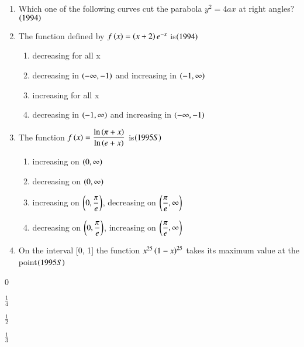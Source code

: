 \documentclass[journal,12pt,twocolumn]{IEEEtran}
\theoremstyle{remark}
\begin{document}
\begin{enumerate}
\begin{enumerate}[label=\alph*.]
\end{enumerate}
\item Which one of the following curves cut the \indent  parabola
$y^2 = 4ax$ at right angles?\hfill$\left(1994\right)$
\begin{enumerate}[label=\alph*.]
\end{enumerate}
\item The function defined by $f\left(x\right) = \left(x+2\right)e^{-x}$ 	
is\hfill$\left(1994\right)$
\begin{enumerate}[label=\alph*.]
	\item decreasing for all x
	\item decreasing in $\left(-\infty, -1\right)$ and increasing
		in $\left(-1, \infty\right)$
        \item increasing for all x
	\item decreasing in $\left(-1, \infty\right)$ and increasing
		in $\left(-\infty, -1\right)$\\
\end{enumerate}
\item The function $f\left(x\right) = 
	\displaystyle\frac{\ln \left(\pi + x\right)}{\ln \left(e + x\right)}$ 
is\hfill$\left(1995S\right)$\\
\begin{enumerate}[label=\alph*.]
	\item increasing on $\left(0, \infty\right)$
	\item decreasing on $\left(0, \infty\right)$
	\item increasing on $\left(0, \displaystyle\frac{\pi}{e}\right)$,
		decreasing on $\left(\displaystyle\frac{\pi}{e}, \infty\right)$
	\item decreasing on $\left(0, \displaystyle\frac{\pi}{e}\right)$,
		increasing on $\left(\displaystyle\frac{\pi}{e}, \infty\right)$\\
\end{enumerate}
\item On the interval [0, 1] the function
	$x^{25}\left(1-x\right)^{25}$ \indent takes 
its maximum value at the point\hfill$\left(1995S\right)$
\end{enumerate}

\begin{enumerate}[label=\alph*.]
\begin{multicols}{4}
	\item 0 
	\item $\displaystyle\frac{1}{4}$ 
	\item $\displaystyle\frac{1}{2}$ 
        \item $\displaystyle\frac{1}{3}$
\end{multicols}
\end{enumerate}
\newpage
\bigskip
\renewcommand{\thefigure}
{\theenumi}
\renewcommand{\thetable}
{\theenumi}
\end{document}
